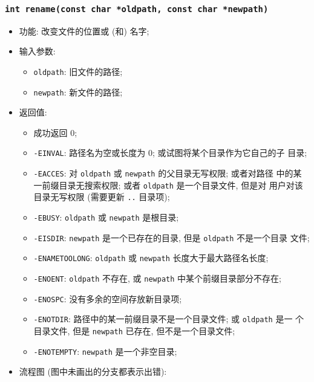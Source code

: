 \documentclass[nofonts]{ctexart}
\begin{document}
  \subsubsection{\texttt{int rename(const char *oldpath, const char *newpath)}}
  \begin{itemize}
\item
  功能: 改变文件的位置或 (和) 名字;
\item
  输入参数:

  \begin{itemize}
  \item
    \texttt{oldpath}: 旧文件的路径;
  \item
    \texttt{newpath}: 新文件的路径;
  \end{itemize}
\item
  返回值:

  \begin{itemize}
  \item
    成功返回 0;
  \item
    \texttt{-EINVAL}: 路径名为空或长度为 0;
    或试图将某个目录作为它自己的子 目录;
  \item
    \texttt{-EACCES}: 对 \texttt{oldpath} 或 \texttt{newpath}
    的父目录无写权限; 或者对路径 中的某一前缀目录无搜索权限; 或者
    \texttt{oldpath} 是一个目录文件, 但是对 用户对该目录无写权限
    (需要更新 \texttt{..} 目录项);
  \item
    \texttt{-EBUSY}: \texttt{oldpath} 或 \texttt{newpath} 是根目录;
  \item
    \texttt{-EISDIR}: \texttt{newpath} 是一个已存在的目录, 但是
    \texttt{oldpath} 不是一个目录 文件;
  \item
    \texttt{-ENAMETOOLONG}: \texttt{oldpath} 或 \texttt{newpath}
    长度大于最大路径名长度;
  \item
    \texttt{-ENOENT}: \texttt{oldpath} 不存在, 或 \texttt{newpath}
    中某个前缀目录部分不存在;
  \item
    \texttt{-ENOSPC}: 没有多余的空间存放新目录项;
  \item
    \texttt{-ENOTDIR}: 路径中的某一前缀目录不是一个目录文件; 或
    \texttt{oldpath} 是一 个目录文件, 但是 \texttt{newpath} 已存在,
    但不是一个目录文件;
  \item
    \texttt{-ENOTEMPTY}: \texttt{newpath} 是一个非空目录;
  \end{itemize}
\item
  流程图
  (图中未画出的分支都表示出错):


\end{itemize}
\end{document}
